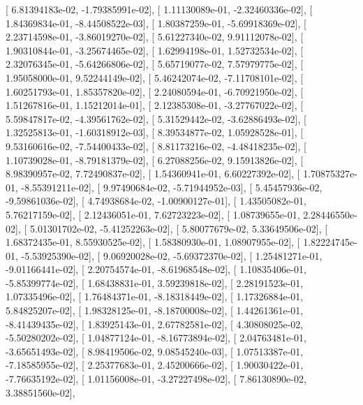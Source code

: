 \documentclass{article}
\begin{document}
       [  6.81394183e-02,  -1.79385991e-02],
       [  1.11130089e-01,  -2.32460336e-02],
       [  1.84369834e-01,  -8.44508522e-03],
       [  1.80387259e-01,  -5.69918369e-02],
       [  2.23714598e-01,  -3.86019270e-02],
       [  5.61227340e-02,   9.91112078e-02],
       [  1.90310844e-01,  -3.25674465e-02],
       [  1.62994198e-01,   1.52732534e-02],
       [  2.32076345e-01,  -5.64266806e-02],
       [  5.65719077e-02,   7.57979775e-02],
       [  1.95058000e-01,   9.52244149e-02],
       [  5.46242074e-02,  -7.11708101e-02],
       [  1.60251793e-01,   1.85357820e-02],
       [  2.24080594e-01,  -6.70921950e-02],
       [  1.51267816e-01,   1.15212014e-01],
       [  2.12385308e-01,  -3.27767022e-02],
       [  5.59847817e-02,  -4.39561762e-02],
       [  5.31529442e-02,  -3.62886493e-02],
       [  1.32525813e-01,  -1.60318912e-03],
       [  8.39534877e-02,   1.05928528e-01],
       [  9.53160616e-02,  -7.54400433e-02],
       [  8.81173216e-02,  -4.48418235e-02],
       [  1.10739028e-01,  -8.79181379e-02],
       [  6.27088256e-02,   9.15913826e-02],
       [  8.98390957e-02,   7.72490837e-02],
       [  1.54360941e-01,   6.60227392e-02],
       [  1.70875327e-01,  -8.55391211e-02],
       [  9.97490684e-02,  -5.71944952e-03],
       [  5.45457936e-02,  -9.59861036e-02],
       [  4.74938684e-02,  -1.00900127e-01],
       [  1.43505082e-01,   5.76217159e-02],
       [  2.12436051e-01,   7.62723223e-02],
       [  1.08739655e-01,   2.28446550e-02],
       [  5.01301702e-02,  -5.41252263e-02],
       [  5.80077679e-02,   5.33649506e-02],
       [  1.68372435e-01,   8.55930525e-02],
       [  1.58380930e-01,   1.08907955e-02],
       [  1.82224745e-01,  -5.53925390e-02],
       [  9.06920028e-02,  -5.69372370e-02],
       [  1.25481271e-01,  -9.01166441e-02],
       [  2.20754574e-01,  -8.61968548e-02],
       [  1.10835406e-01,  -5.85399774e-02],
       [  1.68438831e-01,   3.59239818e-02],
       [  2.28191523e-01,   1.07335496e-02],
       [  1.76484371e-01,  -8.18318449e-02],
       [  1.17326884e-01,   5.84825207e-02],
       [  1.98328125e-01,  -8.18700008e-02],
       [  1.44261361e-01,  -8.41439435e-02],
       [  1.83925143e-01,   2.67782581e-02],
       [  4.30808025e-02,  -5.50280202e-02],
       [  1.04877124e-01,  -8.16773894e-02],
       [  2.04763481e-01,  -3.65651493e-02],
       [  8.98419506e-02,   9.08545240e-03],
       [  1.07513387e-01,  -7.18585955e-02],
       [  2.25377683e-01,   2.45200666e-02],
       [  1.90030422e-01,  -7.76635192e-02],
       [  1.01156008e-01,  -3.27227498e-02],
       [  7.86130890e-02,   3.38851560e-02],
\end{document}
